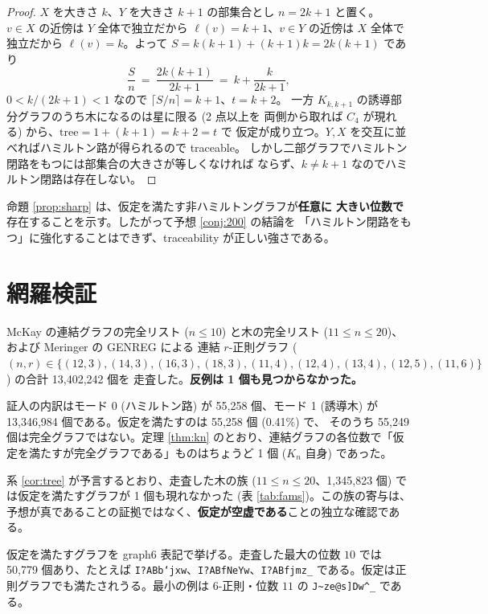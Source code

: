 \documentclass[paper=a4,fontsize=10.5pt,jafontsize=10.5pt]{jlreq}
\theoremstyle{plain}
\theoremstyle{definition}
\begin{document}
\begin{proof}
$X$ を大きさ $k$、$Y$ を大きさ $k+1$ の部集合とし $n = 2k+1$ と置く。
$v \in X$ の近傍は $Y$ 全体で独立だから $\ell(v) = k+1$、$v \in Y$ の近傍は
$X$ 全体で独立だから $\ell(v) = k$。よって
$S = k(k+1) + (k+1)k = 2k(k+1)$ であり
\[ \frac{S}{n} \ = \ \frac{2k(k+1)}{2k+1}
   \ = \ k + \frac{k}{2k+1} , \]
$0 < k/(2k+1) < 1$ なので $\lceil S/n \rceil = k+1$、$t = k+2$。
一方 $K_{k,k+1}$ の誘導部分グラフのうち木になるのは星に限る (2 点以上を
両側から取れば $C_4$ が現れる) から、$\mathrm{tree} = 1 + (k+1) = k+2 = t$ で
仮定が成り立つ。$Y, X$ を交互に並べればハミルトン路が得られるので traceable。
しかし二部グラフでハミルトン閉路をもつには部集合の大きさが等しくなければ
ならず、$k \ne k+1$ なのでハミルトン閉路は存在しない。
\end{proof}

命題 \ref{prop:sharp} は、仮定を満たす非ハミルトングラフが\textbf{任意に
大きい位数で}存在することを示す。したがって予想 \ref{conj:200} の結論を
「ハミルトン閉路をもつ」に強化することはできず、traceability が正しい強さである。

\section{網羅検証}\label{sec:check}

McKay \cite{mckay} の連結グラフの完全リスト ($n \le 10$) と木の完全リスト
($11 \le n \le 20$)、および Meringer の GENREG \cite{genreg} による
連結 $r$-正則グラフ ($(n, r) \in \{(12, 3), (14, 3), (16, 3), (18, 3), (11, 4), (12, 4), (13, 4), (12, 5), (11, 6)\}$) の合計 13,402,242 個を
走査した。\textbf{反例は 1 個も見つからなかった。}

証人の内訳はモード 0 (ハミルトン路) が 55,258 個、モード 1 (誘導木) が
13,346,984 個である。仮定を満たすのは 55,258 個 (0.41\%) で、
そのうち 55,249 個は完全グラフではない。定理 \ref{thm:kn} のとおり、連結グラフの各位数で「仮定を満たすが完全グラフである」ものはちょうど 1 個 ($K_n$ 自身) であった。

系 \ref{cor:tree} が予言するとおり、走査した木の族 ($11 \le n \le 20$、1,345,823 個) では仮定を満たすグラフが 1 個も現れなかった (表 \ref{tab:fams})。この族の寄与は、予想が真であることの証拠ではなく、\textbf{仮定が空虚である}ことの独立な確認である。

仮定を満たすグラフを graph6 表記で挙げる。走査した最大の位数 $10$ では 50,779 個あり、たとえば \texttt{I?ABb`jxw}、\texttt{I?ABfNeYw}、\texttt{I?ABfjmz\_} である。仮定は正則グラフでも満たされうる。最小の例は $6$-正則・位数 $11$ の \texttt{J\textasciitilde{}ze@s]Dw\textasciicircum{}\_} である。
\end{document}
